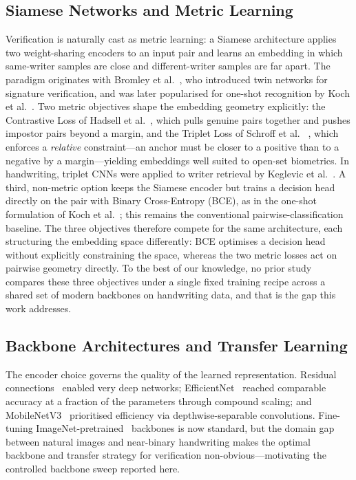 \subsection{Siamese Networks and Metric Learning}
Verification is naturally cast as metric learning: a Siamese architecture
applies two weight-sharing encoders to an input pair and learns an embedding
in which same-writer samples are close and different-writer samples are far
apart. The paradigm originates with Bromley et al.~\cite{bromley1994siamese},
who introduced twin networks for signature verification, and was later
popularised for one-shot recognition by Koch et al.~\cite{koch2015siamese}.
Two metric objectives shape the embedding geometry explicitly: the Contrastive
Loss of Hadsell et al.~\cite{hadsell2006contrastive}, which pulls genuine
pairs together and pushes impostor pairs beyond a margin, and the Triplet Loss
of Schroff et al. ~\cite{schroff2015facenet}, which enforces a \emph{relative}
constraint—an anchor must be closer to a positive than to a negative by a
margin—yielding embeddings well suited to open-set biometrics. In handwriting,
triplet CNNs were applied to writer retrieval by
Keglevic et al.~\cite{keglevic2018}. A third, non-metric option keeps the
Siamese encoder but trains a decision head directly on the pair with Binary
Cross-Entropy (BCE), as in the one-shot formulation of Koch et
al.~\cite{koch2015siamese}; this remains the conventional
pairwise-classification baseline. The three objectives therefore compete for
the same architecture, each structuring the embedding space differently: BCE
optimises a decision head without explicitly constraining the space, whereas
the two metric losses act on pairwise geometry directly. To the best of our
knowledge, no prior study compares these three objectives under a single
fixed training recipe across a shared set of modern backbones on handwriting
data, and that is the gap this work addresses.

\subsection{Backbone Architectures and Transfer Learning}
The encoder choice governs the quality of the learned representation. Residual
connections~\cite{he2016resnet} enabled very deep networks;
EfficientNet~\cite{tan2019efficientnet} reached comparable accuracy at a
fraction of the parameters through compound scaling; and
MobileNetV3~\cite{howard2019mobilenetv3} prioritised efficiency via
depthwise-separable convolutions. Fine-tuning
ImageNet-pretrained~\cite{deng2009imagenet} backbones is now standard, but the
domain gap between natural images and near-binary handwriting makes the
optimal backbone and transfer strategy for verification non-obvious—motivating
the controlled backbone sweep reported here.


